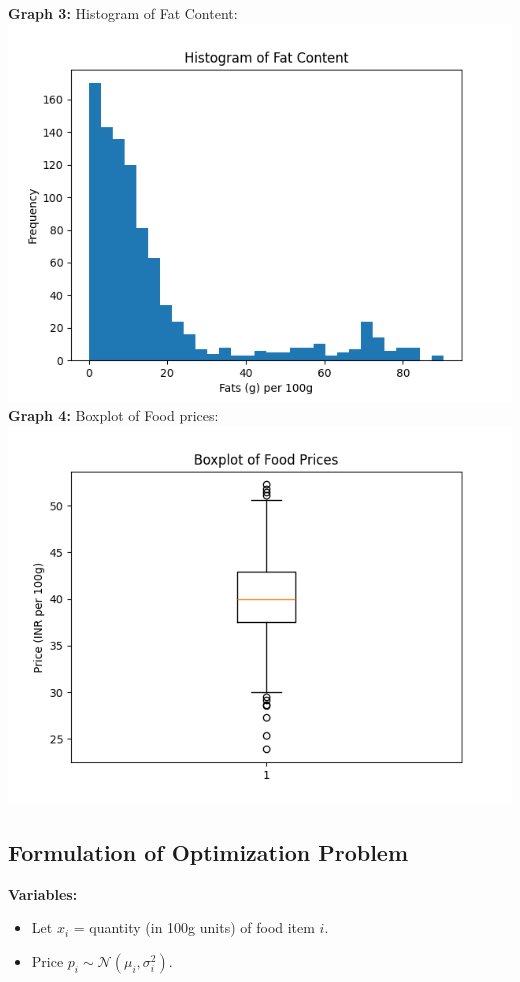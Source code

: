 \documentclass{article}
\begin{document}
\textbf{Graph 3:} Histogram of Fat Content:\\
\includegraphics[scale = 0.75]{Fats_hist.png}
\textbf{Graph 4:} Boxplot of Food prices:\\
\includegraphics[scale = 0.75]{Price_boxplot.png}

\subsection*{Formulation of Optimization Problem}
\textbf{Variables:}
\begin{itemize}
    \item Let $x_i$ = quantity (in 100g units) of food item $i$.
    \item Price $p_i \sim \mathcal{N}(\mu_i, \sigma_i^2)$.
\end{itemize}
\end{document}
